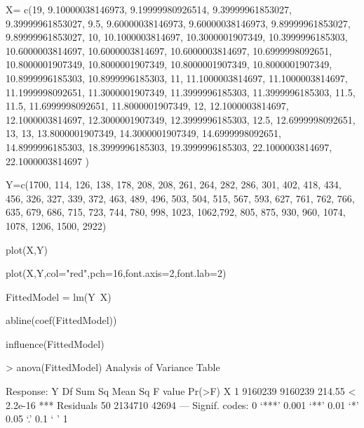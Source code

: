 X= c(19, 9.10000038146973, 9.19999980926514, 9.39999961853027, 9.39999961853027, 
9.5, 9.60000038146973, 9.60000038146973, 9.89999961853027, 9.89999961853027, 
10, 10.1000003814697, 10.3000001907349, 10.3999996185303, 10.6000003814697, 
10.6000003814697, 10.6000003814697, 10.6999998092651, 10.8000001907349, 
10.8000001907349, 10.8000001907349, 10.8000001907349, 10.8999996185303, 
10.8999996185303, 11, 11.1000003814697, 11.1000003814697, 11.1999998092651, 
11.3000001907349, 11.3999996185303, 11.3999996185303, 11.5, 11.5, 
11.6999998092651, 11.8000001907349, 12, 12.1000003814697, 12.1000003814697, 
12.3000001907349, 12.3999996185303, 12.5, 12.6999998092651, 13, 
13, 13.8000001907349, 14.3000001907349, 14.6999998092651, 14.8999996185303, 
18.3999996185303, 19.3999996185303, 22.1000003814697, 22.1000003814697
)


Y=c(1700, 114, 126, 138, 178, 208, 208, 261, 264, 282, 286, 301, 
402, 418, 434, 456, 326, 327, 339, 372,  463, 489, 496, 503, 504, 
515, 567, 593, 627, 761, 762, 766,  635, 679, 686, 715, 723, 744, 
780, 998, 1023, 1062,792, 805, 875, 930, 960,  1074, 1078, 1206, 
1500, 2922)

plot(X,Y)

plot(X,Y,col="red",pch=16,font.axis=2,font.lab=2)

FittedModel = lm(Y~X)

abline(coef(FittedModel))

influence(FittedModel)


> anova(FittedModel)
Analysis of Variance Table

Response: Y
          	Df  	Sum Sq 	Mean Sq 	F value    	Pr(>F)    
X         	 1 	9160239 	9160239 	 214.55 	< 2.2e-16 ***
Residuals 	50 	2134710   	42694                      
---
Signif. codes:  0 ‘***’ 0.001 ‘**’ 0.01 ‘*’ 0.05 ‘.’ 0.1 ‘ ’ 1 


